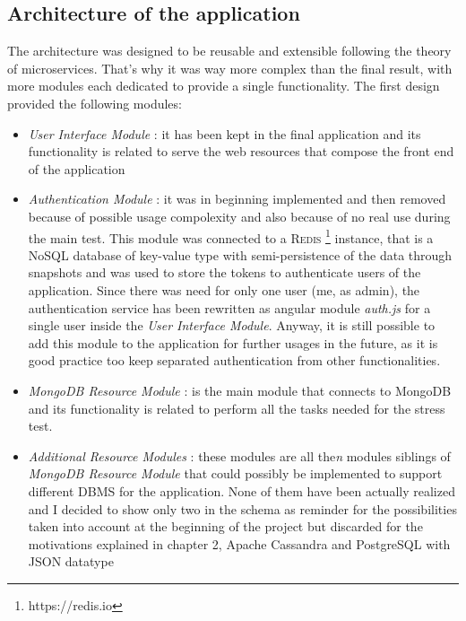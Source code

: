 \subsection{Architecture of the application}
The architecture was designed to be reusable and extensible following the theory of microservices. That’s why it was way more complex than the final result, with more modules each dedicated to provide a single functionality. The first design provided the following modules:
\begin{itemize}
	\item \textit{User Interface Module} : it has been kept in the final application and its functionality is related to serve the web resources that compose the front end of the application
	\item \textit{Authentication Module} : it was in beginning implemented and then removed because of possible usage compolexity and also because of no real use during the main test. This module was connected to a \textsc{Redis} \footnote{https://redis.io} instance, that is a NoSQL database of key-value type with semi-persistence of the data through snapshots and was used to store the tokens to authenticate users of the application. Since there was need for only one user (me, as admin), the authentication service has been rewritten as angular module \textit{auth.js} for a single user inside the \textit{User Interface Module}. Anyway, it is still possible to add this module to the application for further usages in the future, as it is good practice too keep separated authentication from other functionalities.
	\item \textit{MongoDB Resource Module} : is the main module that connects to MongoDB and its functionality is related to perform all the tasks needed for the stress test.
	\item \textit{Additional Resource Modules} : these modules are all the\textit{n} modules siblings of \textit{MongoDB Resource Module} that could possibly be implemented to support different DBMS for the application. None of them have been actually realized and I decided to show only two in the schema as reminder for the possibilities taken into account at the beginning of the project but discarded for the motivations explained in chapter 2, Apache Cassandra and PostgreSQL with JSON datatype
\end{itemize}


